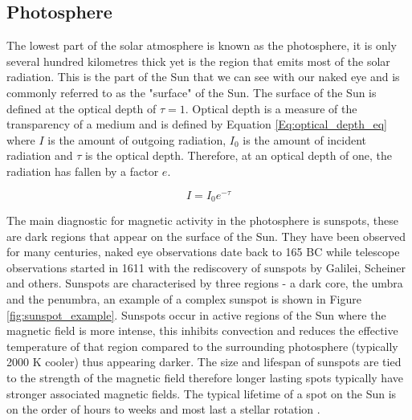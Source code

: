 \subsection{Photosphere}
\label{Chp1_photosphere}

The lowest part of the solar atmosphere is known as the photosphere, it is only several hundred kilometres thick yet is the region that emits most of the solar radiation. This is the part of the Sun that we can see with our naked eye and is commonly referred to as the "surface" of the Sun. The surface of the Sun is defined at the optical depth of $\tau = 1$. Optical depth is a measure of the transparency of a medium and is defined by Equation \ref{Eq:optical_depth_eq} where $I$ is the amount of outgoing radiation, $I_{0}$ is the amount of incident radiation and $\tau$ is the optical depth. Therefore, at an optical depth of one, the radiation has fallen by a factor $e$.

\begin{equation}
    I = I_{0}e^{-\tau}
    \label{Eq:optical_depth_eq}
\end{equation}

The main diagnostic for magnetic activity in the photosphere is sunspots, these are dark regions that appear on the surface of the Sun. They have been observed for many centuries, naked eye observations date back to 165 BC \citep{Wittmann_1987} while telescope observations started in 1611 with the rediscovery of sunspots by Galilei, Scheiner and others. Sunspots are characterised by three regions - a dark core, the umbra and the penumbra, an example of a complex sunspot is shown in Figure \ref{fig:sunspot_example}. Sunspots occur in active regions of the Sun where the magnetic field is more intense, this inhibits convection and reduces the effective temperature of that region compared to the surrounding photosphere (typically 2000 K cooler) thus appearing darker. The size and lifespan of sunspots are tied to the strength of the magnetic field therefore longer lasting spots typically have stronger associated magnetic fields. The typical lifetime of a spot on the Sun is on the order of hours to weeks and most last a stellar rotation \citep{Bradshaw_Hartigan_2014}.

